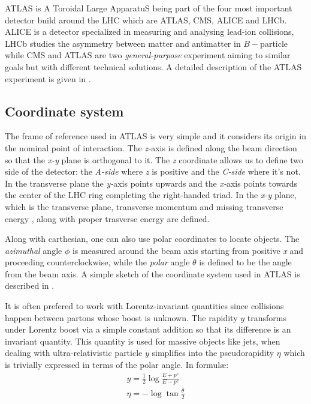 ATLAS is A Toroidal Large ApparatuS being part of the four most important detector build around the LHC which are ATLAS, CMS, ALICE and LHCb. ALICE is a detector specialized in measuring and analysing lead-ion collisions, LHCb studies the asymmetry between matter and antimatter in $B-$particle while CMS and ATLAS are two \emph{general-purpose} experiment aiming to similar goals but with different technical solutions. A detailed description of the ATLAS experiment is given in \cite{atcollab:jinst}.

\subsection{Coordinate system}
The frame of reference used in ATLAS is very simple and it considers its origin in the nominal point of interaction. The \emph{z-}axis is defined along the beam direction so that the \emph{x-y} plane is orthogonal to it. The \emph{z} coordinate allows us to define two side of the detector: the \emph{A-side} where \emph{z} is positive and the \emph{C-side} where it's not. In the transverse plane the \emph{y-}axis points upwards and the \emph{x-}axis points towards the center of the LHC ring completing the right-handed triad. In the \emph{x-y} plane, which is the transverse plane, transverse momentum \pt and missing transverse energy \met, along with proper trasverse energy \et are defined.

Along with carthesian, one can also use polar coordinates to locate objects. The \emph{azimuthal} angle $\phi$ is measured around the beam axis starting from positive \emph{x} and proceeding counterclockwise, while the \emph{polar} angle $\theta$ is defined to be the angle from the beam axis. A simple sketch of the coordinate system used in ATLAS is described in \Fig{\ref{fig:coordinate}}.

It is often prefered to work with Lorentz-invariant quantities since collisions happen between partons whose boost is unknown. The rapidity $y$ transforms under Lorentz boost via a simple constant addition so that its difference is an invariant quantity. This quantity is used for massive objects like jets, when dealing with ultra-relativistic particle $y$ simplifies into the pseudorapidity $\eta$ which is trivially expressed in terms of the polar angle. In formul\ae:
\begin{gather}
	y=\frac{1}{2}\log{\frac{E+p^z}{E-p^z}}\\
	\eta=-\log{\tan{\frac{\theta}{2}}}
\end{gather}

